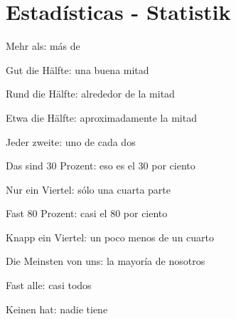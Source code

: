 \section{Estadísticas - Statistik}
\begin{multicols}{1}
\begin{myitemize}
\item Mehr als: más de
\item Gut die Hälfte: una buena mitad
\item Rund die Hälfte: alrededor de la mitad
\item Etwa die Hälfte: aproximadamente la mitad
\item Jeder zweite: uno de cada dos
\item Das sind 30 Prozent: eso es el 30 por ciento
\item Nur ein Viertel: sólo una cuarta parte
\item Fast 80 Prozent: casi el 80 por ciento
\item Knapp ein Viertel: un poco menos de un cuarto
\item Die Meinsten von uns: la mayoría de nosotros
\item Fast alle: casi todos
\item Keinen hat: nadie tiene
\end{myitemize}
\end{multicols}

